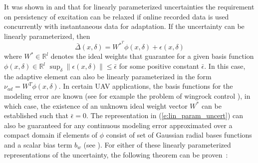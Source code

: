 It was shown in \cite{Chowdhary:phd:2010} and \cite{Chowdhary:CDC:10} that for linearly parameterized uncertainties the requirement on persistency of excitation can be relaxed if online recorded data is used concurrently with instantaneous data for adaptation. If the uncertainty can be linearly parameterized, then
\begin{equation}\label{e:lin_param_uncert}
\bar \Delta(x,\delta)=W^{*^T}\phi(x,\delta)+\epsilon(x,\delta)
\end{equation}
where $W^*\in\mathbb{R}^l$ denotes the ideal weights that guarantee for a given basis function $\phi(x,\delta)\in\mathbb{R}^l$ $\sup_{\delta}\|\epsilon(x,\delta)\|\leq \bar\epsilon$ for some positive constant $\bar \epsilon$. In this case, the adaptive element can also be linearly parameterized in the form $\nu_{ad}=W^T\phi(x,\delta)$. In certain UAV applications, the basis functions for the modeling error are known (see for example the problem of wingrock control \cite{Singh:95}), in which case, the existence of an unknown ideal weight vector $W^*$ can be established such that $\bar \epsilon=0$. The representation in (\ref{e:lin_param_uncert}) can also be guaranteed for any continuous modeling error approximated over a compact domain if elements of $\phi$ consist of set of Gaussian radial bases functions and a scalar bias term $b_w$ (see \cite{Park:91,Haykin:98bk}).  For either of these linearly parameterized representations of the uncertainty, the following theorem can be proven~\cite{Chowdhary:phd:2010,Chowdhary:CDC:10,chowdhary:acc11:2011b}:


